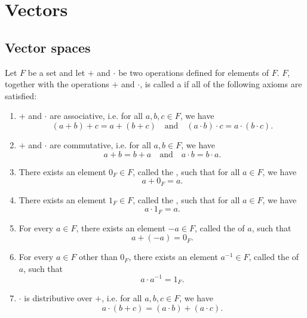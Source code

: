 \chapter{Vectors}

\section{Vector spaces}

\begin{defn}
Let $ F $ be a set and let $ + $ and $ \cdot $ be two operations defined for elements of $ F $. $ F $, together with the operations $ + $ and $ \cdot $, is called a  if all of the following axioms are satisfied:
\begin{enumerate}
    \item $ + $ and $ \cdot $ are associative, i.e. for all $ a,b,c\in F $, we have
    \begin{equation*}
        (a+b)+c=a+(b+c) \quad\text{and}\quad (a\cdot b)\cdot c=a\cdot(b\cdot c).
    \end{equation*}

    \item $ + $ and $ \cdot $ are commutative, i.e. for all $ a,b\in F $, we have
    \begin{equation*}
        a+b=b+a \quad\text{and}\quad a\cdot b=b\cdot a.
    \end{equation*}

    \item There exists an element $ 0_F\in F $, called the , such that for all $ a\in F $, we have
    \begin{equation*}
        a+0_F=a.
    \end{equation*}

    \item There exists an element $ 1_F\in F $, called the , such that for all $ a\in F $, we have
    \begin{equation*}
        a\cdot 1_F=a.
    \end{equation*}

    \item For every $ a\in F $, there exists an element $ -a\in F $, called the  of $ a $, such that
    \begin{equation*}
        a+(-a)=0_F.
    \end{equation*}

    \item For every $ a\in F $ other than $ 0_F $, there exists an element $ a^{-1}\in F $, called the  of $ a $, such that
    \begin{equation*}
        a\cdot a^{-1}=1_F.
    \end{equation*}

    \item $ \cdot $ is distributive over $ + $, i.e. for all $ a,b,c\in F $, we have
    \begin{equation*}
        a\cdot(b+c)=(a\cdot b)+(a\cdot c).
    \end{equation*}
\end{enumerate}
\end{defn}

